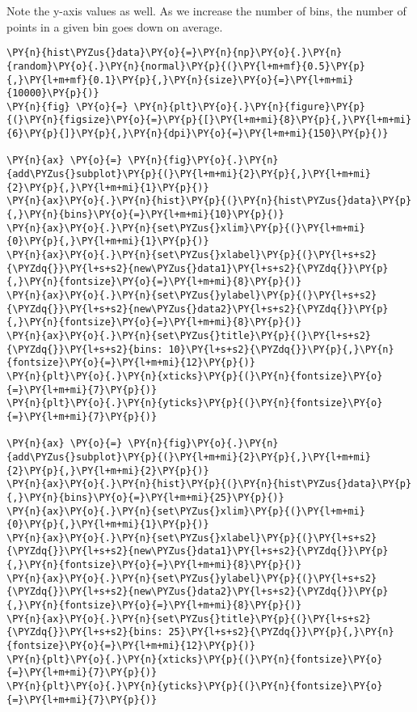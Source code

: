 Note the y-axis values as well. As we increase the number of bins, the
number of points in a given bin goes down on average.

    \begin{tcolorbox}[breakable, size=fbox, boxrule=1pt, pad at break*=1mm,colback=cellbackground, colframe=cellborder]
\begin{Verbatim}[commandchars=\\\{\}]
\PY{n}{hist\PYZus{}data}\PY{o}{=}\PY{n}{np}\PY{o}{.}\PY{n}{random}\PY{o}{.}\PY{n}{normal}\PY{p}{(}\PY{l+m+mf}{0.5}\PY{p}{,}\PY{l+m+mf}{0.1}\PY{p}{,}\PY{n}{size}\PY{o}{=}\PY{l+m+mi}{10000}\PY{p}{)}
\PY{n}{fig} \PY{o}{=} \PY{n}{plt}\PY{o}{.}\PY{n}{figure}\PY{p}{(}\PY{n}{figsize}\PY{o}{=}\PY{p}{[}\PY{l+m+mi}{8}\PY{p}{,}\PY{l+m+mi}{6}\PY{p}{]}\PY{p}{,}\PY{n}{dpi}\PY{o}{=}\PY{l+m+mi}{150}\PY{p}{)} 

\PY{n}{ax} \PY{o}{=} \PY{n}{fig}\PY{o}{.}\PY{n}{add\PYZus{}subplot}\PY{p}{(}\PY{l+m+mi}{2}\PY{p}{,}\PY{l+m+mi}{2}\PY{p}{,}\PY{l+m+mi}{1}\PY{p}{)}
\PY{n}{ax}\PY{o}{.}\PY{n}{hist}\PY{p}{(}\PY{n}{hist\PYZus{}data}\PY{p}{,}\PY{n}{bins}\PY{o}{=}\PY{l+m+mi}{10}\PY{p}{)}
\PY{n}{ax}\PY{o}{.}\PY{n}{set\PYZus{}xlim}\PY{p}{(}\PY{l+m+mi}{0}\PY{p}{,}\PY{l+m+mi}{1}\PY{p}{)}
\PY{n}{ax}\PY{o}{.}\PY{n}{set\PYZus{}xlabel}\PY{p}{(}\PY{l+s+s2}{\PYZdq{}}\PY{l+s+s2}{new\PYZus{}data1}\PY{l+s+s2}{\PYZdq{}}\PY{p}{,}\PY{n}{fontsize}\PY{o}{=}\PY{l+m+mi}{8}\PY{p}{)}
\PY{n}{ax}\PY{o}{.}\PY{n}{set\PYZus{}ylabel}\PY{p}{(}\PY{l+s+s2}{\PYZdq{}}\PY{l+s+s2}{new\PYZus{}data2}\PY{l+s+s2}{\PYZdq{}}\PY{p}{,}\PY{n}{fontsize}\PY{o}{=}\PY{l+m+mi}{8}\PY{p}{)}
\PY{n}{ax}\PY{o}{.}\PY{n}{set\PYZus{}title}\PY{p}{(}\PY{l+s+s2}{\PYZdq{}}\PY{l+s+s2}{bins: 10}\PY{l+s+s2}{\PYZdq{}}\PY{p}{,}\PY{n}{fontsize}\PY{o}{=}\PY{l+m+mi}{12}\PY{p}{)}
\PY{n}{plt}\PY{o}{.}\PY{n}{xticks}\PY{p}{(}\PY{n}{fontsize}\PY{o}{=}\PY{l+m+mi}{7}\PY{p}{)}
\PY{n}{plt}\PY{o}{.}\PY{n}{yticks}\PY{p}{(}\PY{n}{fontsize}\PY{o}{=}\PY{l+m+mi}{7}\PY{p}{)}

\PY{n}{ax} \PY{o}{=} \PY{n}{fig}\PY{o}{.}\PY{n}{add\PYZus{}subplot}\PY{p}{(}\PY{l+m+mi}{2}\PY{p}{,}\PY{l+m+mi}{2}\PY{p}{,}\PY{l+m+mi}{2}\PY{p}{)}
\PY{n}{ax}\PY{o}{.}\PY{n}{hist}\PY{p}{(}\PY{n}{hist\PYZus{}data}\PY{p}{,}\PY{n}{bins}\PY{o}{=}\PY{l+m+mi}{25}\PY{p}{)}
\PY{n}{ax}\PY{o}{.}\PY{n}{set\PYZus{}xlim}\PY{p}{(}\PY{l+m+mi}{0}\PY{p}{,}\PY{l+m+mi}{1}\PY{p}{)}
\PY{n}{ax}\PY{o}{.}\PY{n}{set\PYZus{}xlabel}\PY{p}{(}\PY{l+s+s2}{\PYZdq{}}\PY{l+s+s2}{new\PYZus{}data1}\PY{l+s+s2}{\PYZdq{}}\PY{p}{,}\PY{n}{fontsize}\PY{o}{=}\PY{l+m+mi}{8}\PY{p}{)}
\PY{n}{ax}\PY{o}{.}\PY{n}{set\PYZus{}ylabel}\PY{p}{(}\PY{l+s+s2}{\PYZdq{}}\PY{l+s+s2}{new\PYZus{}data2}\PY{l+s+s2}{\PYZdq{}}\PY{p}{,}\PY{n}{fontsize}\PY{o}{=}\PY{l+m+mi}{8}\PY{p}{)}
\PY{n}{ax}\PY{o}{.}\PY{n}{set\PYZus{}title}\PY{p}{(}\PY{l+s+s2}{\PYZdq{}}\PY{l+s+s2}{bins: 25}\PY{l+s+s2}{\PYZdq{}}\PY{p}{,}\PY{n}{fontsize}\PY{o}{=}\PY{l+m+mi}{12}\PY{p}{)}
\PY{n}{plt}\PY{o}{.}\PY{n}{xticks}\PY{p}{(}\PY{n}{fontsize}\PY{o}{=}\PY{l+m+mi}{7}\PY{p}{)}
\PY{n}{plt}\PY{o}{.}\PY{n}{yticks}\PY{p}{(}\PY{n}{fontsize}\PY{o}{=}\PY{l+m+mi}{7}\PY{p}{)}


\end{Verbatim}
\end{tcolorbox}
